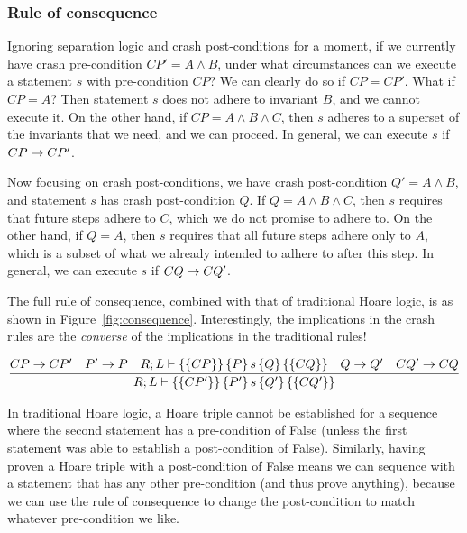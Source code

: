 \subsubsection{Rule of consequence}


Ignoring separation logic and crash post-conditions for a moment, if we
currently have crash pre-condition $CP'=A \wedge B$, under what circumstances
can we execute a statement $s$ with pre-condition $CP$? We can clearly do so if
$CP=CP'$.
What if $CP=A$? Then statement $s$ does not adhere to invariant $B$,
and we cannot execute it.
On the other hand, if $CP=A \wedge B \wedge C$, then
$s$ adheres to a superset of the invariants that we need, and we can
proceed.
In
general, we can execute $s$ if $CP \rightarrow CP'$.

Now focusing on crash post-conditions, we have crash post-condition $Q'=A \wedge
B$, and statement $s$ has crash post-condition $Q$.
If $Q=A \wedge B \wedge C$,
then $s$ requires that future steps adhere to $C$, which we do not promise to
adhere to.
On the other hand, if $Q=A$, then $s$ requires that all future steps
adhere only to $A$, which is a subset of what we already intended to adhere to
after this step.
In general, we can execute $s$ if $CQ \rightarrow CQ'$.

The full rule of consequence, combined with that of traditional Hoare logic, is
as shown in Figure~\ref{fig:consequence}.
Interestingly, the implications in
the crash rules are the \textit{converse} of the implications in the traditional
rules!

\begin{figure*}
\begin{gather*}
\infer{\hoarestmt{R}{L}{CP'}{P'}{s}{Q'}{CQ'}}
      {CP \imp CP' & P' \imp P & \hoarestmt{R}{L}{CP}{P}{s}{Q}{CQ}
      & Q \imp Q' & CQ' \imp CQ}
\end{gather*}
\caption{Rule of Consequence}
\label{fig:consequence}
\end{figure*}

In traditional Hoare logic, a Hoare triple cannot be established for a sequence
where the second statement has a pre-condition of False (unless the first
statement was able to establish a post-condition of False).
Similarly, having
proven a Hoare triple with a post-condition of False means we can sequence with
a statement that has any other pre-condition (and thus prove anything), because
we can use the rule of consequence to change the post-condition to match
whatever pre-condition we like.

